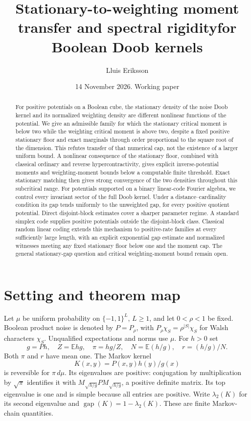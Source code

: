 \documentclass[11pt]{article}
\title{Stationary-to-weighting moment transfer and spectral rigidity\newline for Boolean Doob kernels}
\author{Lluis Eriksson}
\date{14 November 2026. Working paper}
\newcommand{\E}{\mathbb E}
\begin{document}
\maketitle
\begin{abstract}
For positive potentials on a Boolean cube, the stationary density of the noise Doob kernel and its normalized weighting density are different nonlinear functions of the potential. We give an admissible family for which the stationary critical moment is below two while the weighting critical moment is above two, despite a fixed positive stationary floor and exact marginals through order proportional to the square root of the dimension. This refutes transfer of that numerical cap, not the existence of a larger uniform bound. A nonlinear consequence of the stationary floor, combined with classical ordinary and reverse hypercontractivity, gives explicit inverse-potential moments and weighting-moment bounds below a computable finite threshold. Exact stationary matching then gives strong convergence of the two densities throughout this subcritical range. For potentials supported on a binary linear-code Fourier algebra, we control every invariant sector of the full Doob kernel. Under a distance--cardinality condition its gap tends uniformly to the unweighted gap, for every positive quotient potential. Direct disjoint-block estimates cover a sharper parameter regime. A standard simplex code supplies positive potentials outside the disjoint-block class. Classical random linear coding extends this mechanism to positive-rate families at every sufficiently large length, with an explicit exponential gap estimate and normalized witnesses meeting any fixed stationary floor below one and the moment cap. The general stationary-gap question and critical weighting-moment bound remain open.
\end{abstract}

\section{Setting and theorem map}
Let $\mu$ be uniform probability on $\{-1,1\}^L$, $L\geq1$, and let $0<\rho<1$ be fixed. Boolean product noise is denoted by $P=P_\rho$, with $P_\rho\chi_S=\rho^{|S|}\chi_S$ for Walsh characters $\chi_S$. Unqualified expectations and norms use $\mu$. For $h>0$ set
\[
 g=Ph,\quad Z=\E hg,\quad \pi=hg/Z,\quad
 N=\E(h/g),\quad r=(h/g)/N.
\]
Both $\pi$ and $r$ have mean one. The Markov kernel
\[
 K(x,y)=P(x,y)h(y)/g(x)
\]
is reversible for $\pi\,d\mu$. Its eigenvalues are positive: conjugation by multiplication by $\sqrt\pi$ identifies it with
$M_{\sqrt{h/g}}P M_{\sqrt{h/g}}$, a positive definite matrix. Its top eigenvalue is one and is simple because all entries are positive. Write $\lambda_2(K)$ for its second eigenvalue and $\operatorname{gap}(K)=1-\lambda_2(K)$. These are finite Markov-chain quantities.
\end{document}
